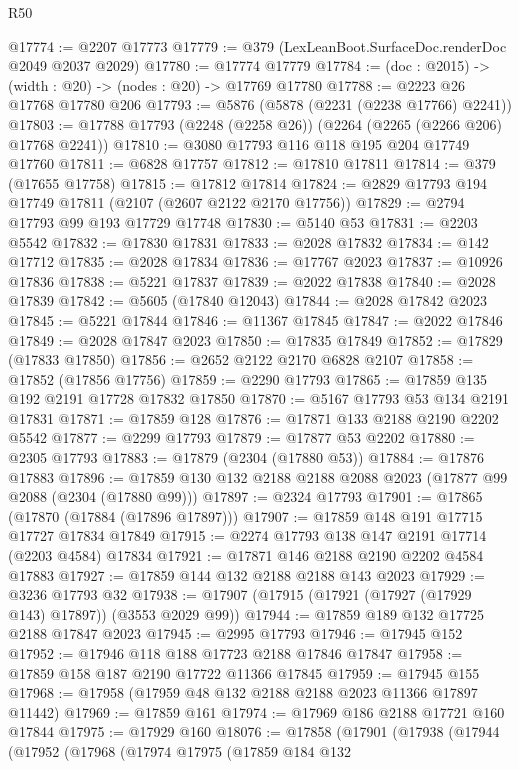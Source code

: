 \begin{lexlean}{R50}
\begin{coremodule}
@17774 := @2207 @17773
@17779 := @379 (LexLeanBoot.SurfaceDoc.renderDoc @2049 @2037 @2029)
@17780 := @17774 @17779
@17784 := (doc : @2015) -> (width : @20) -> (nodes : @20) -> @17769 @17780
@17788 := @2223 @26 @17768 @17780 @206
@17793 := @5876 (@5878 (@2231 (@2238 @17766) @2241))
@17803 := @17788 @17793 (@2248 (@2258 @26)) (@2264 (@2265 (@2266 @206) @17768 @2241))
@17810 := @3080 @17793 @116 @118 @195 @204 @17749 @17760
@17811 := @6828 @17757
@17812 := @17810 @17811
@17814 := @379 (@17655 @17758)
@17815 := @17812 @17814
@17824 := @2829 @17793 @194 @17749 @17811 (@2107 (@2607 @2122 @2170 @17756))
@17829 := @2794 @17793 @99 @193 @17729 @17748
@17830 := @5140 @53
@17831 := @2203 @5542
@17832 := @17830 @17831
@17833 := @2028 @17832
@17834 := @142 @17712
@17835 := @2028 @17834
@17836 := @17767 @2023
@17837 := @10926 @17836
@17838 := @5221 @17837
@17839 := @2022 @17838
@17840 := @2028 @17839
@17842 := @5605 (@17840 @12043)
@17844 := @2028 @17842 @2023
@17845 := @5221 @17844
@17846 := @11367 @17845
@17847 := @2022 @17846
@17849 := @2028 @17847 @2023
@17850 := @17835 @17849
@17852 := @17829 (@17833 @17850)
@17856 := @2652 @2122 @2170 @6828 @2107
@17858 := @17852 (@17856 @17756)
@17859 := @2290 @17793
@17865 := @17859 @135 @192 @2191 @17728 @17832 @17850
@17870 := @5167 @17793 @53 @134 @2191 @17831
@17871 := @17859 @128
@17876 := @17871 @133 @2188 @2190 @2202 @5542
@17877 := @2299 @17793
@17879 := @17877 @53 @2202
@17880 := @2305 @17793
@17883 := @17879 (@2304 (@17880 @53))
@17884 := @17876 @17883
@17896 := @17859 @130 @132 @2188 @2188 @2088 @2023 (@17877 @99 @2088 (@2304 (@17880 @99)))
@17897 := @2324 @17793
@17901 := @17865 (@17870 (@17884 (@17896 @17897)))
@17907 := @17859 @148 @191 @17715 @17727 @17834 @17849
@17915 := @2274 @17793 @138 @147 @2191 @17714 (@2203 @4584) @17834
@17921 := @17871 @146 @2188 @2190 @2202 @4584 @17883
@17927 := @17859 @144 @132 @2188 @2188 @143 @2023
@17929 := @3236 @17793 @32
@17938 := @17907 (@17915 (@17921 (@17927 (@17929 @143) @17897)) (@3553 @2029 @99))
@17944 := @17859 @189 @132 @17725 @2188 @17847 @2023
@17945 := @2995 @17793
@17946 := @17945 @152
@17952 := @17946 @118 @188 @17723 @2188 @17846 @17847
@17958 := @17859 @158 @187 @2190 @17722 @11366 @17845
@17959 := @17945 @155
@17968 := @17958 (@17959 @48 @132 @2188 @2188 @2023 @11366 @17897 @11442)
@17969 := @17859 @161
@17974 := @17969 @186 @2188 @17721 @160 @17844
@17975 := @17929 @160
@18076 := @17858
    (@17901
      (@17938
        (@17944
          (@17952
            (@17968
              (@17974
                @17975
                (@17859
                  @184
                  @132

\end{coremodule}
\end{lexlean}
